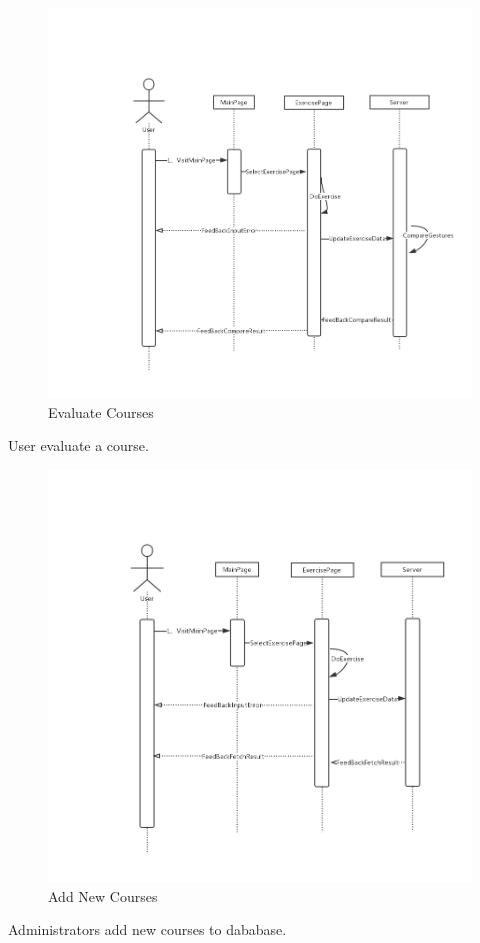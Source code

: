 \documentclass[16pt]{scrreprt}
\begin{document}
\begin{figure}[H]
    \includegraphics[width=\linewidth]{./FuncPhoto/17.png}   
    \caption{Evaluate Courses}
\end{figure}
User evaluate a course.

\begin{figure}[H]
    \includegraphics[width=\linewidth]{./FuncPhoto/18.png}   
    \caption{Add New Courses}
\end{figure}
Administrators add new courses to dababase.
\end{document}
